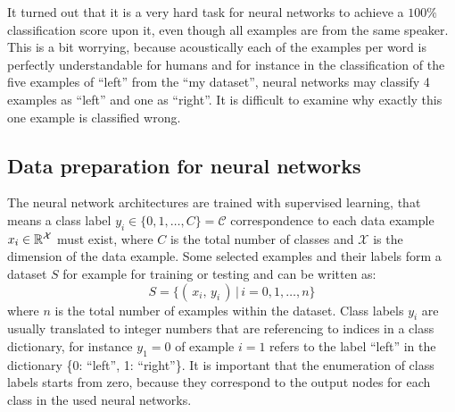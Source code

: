 \FloatBarrier
\noindent
It turned out that it is a very hard task for neural networks to achieve a $100\%$ classification score upon it, even though all examples are from the same speaker.
This is a bit worrying, because acoustically each of the examples per word is perfectly understandable for humans and for instance in the classification of the five examples of \enquote{left} from the \enquote{my dataset}, neural networks may classify 4 examples as \enquote{left} and one as \enquote{right}.
It is difficult to examine why exactly this one example is classified wrong.



\subsection{Data preparation for neural networks}\label{sec:exp_data_prep}
The neural network architectures are trained with supervised learning, that means a class label $y_i \in \{0, 1, \dots, C\} = \mathcal{C}$ correspondence to each data example $x_i \in \mathbb{R}^{\mathcal{X}}$ must exist, where $C$ is the total number of classes and $\mathcal{X}$ is the dimension of the data example.
Some selected examples and their labels form a dataset $S$ for example for training or testing and can be written as:
\begin{equation}\label{eq:exp_dataset}
  S = \{ (\,x_i, \, y_i\,) \, | \, i = 0, 1, \dots, n \}
\end{equation}
where $n$ is the total number of examples within the dataset.
Class labels $y_i$ are usually translated to integer numbers that are referencing to indices in a class dictionary, for instance $y_1 = 0$ of example $i=1$ refers to the label \enquote{left} in the dictionary \{0: \enquote{left}, 1: \enquote{right}\}.
It is important that the enumeration of class labels starts from zero, because they correspond to the output nodes for each class in the used neural networks.

